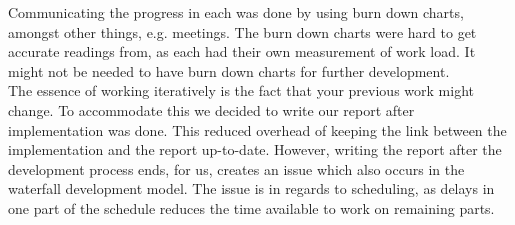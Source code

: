 Communicating the progress in each \localgroup[] was done by using burn down charts, amongst other things, e.g. meetings.
The burn down charts were hard to get accurate readings from, as each \localgroup[] had their own measurement of work load.
It might not be needed to have burn down charts for further development. \\

The essence of working iteratively is the fact that your previous work might change.
To accommodate this we decided to write our report after implementation was done. This reduced overhead of keeping the link between the implementation and the report up-to-date.
However, writing the report after the development process ends, for us, creates an issue which also occurs in the  waterfall development model.
The issue is in regards to scheduling, as delays in one part of the schedule reduces the time available to work on remaining parts.

